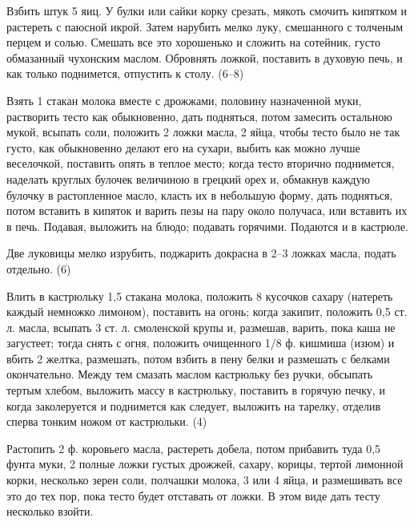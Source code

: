 
Взбить штук 5 яиц. У булки или сайки корку срезать, мякоть смочить кипятком и растереть с паюсной икрой. Затем нарубить мелко луку, смешанного с толченым перцем и солью. Смешать все это хорошенько и сложить на сотейник, густо обмазанный чухонским маслом. Обровнять ложкой, поставить в духовую печь, и как только поднимется, отпустить к столу. (6--8) 


Взять 1 стакан молока вместе с дрожжами, половину назначенной муки, растворить тесто как обыкновенно, дать подняться, потом замесить остальною мукой, всыпать соли, положить 2 ложки масла, 2 яйца, чтобы тесто было не так густо, как обыкновенно делают его на сухари, выбить как можно лучше веселочкой, поставить опять в теплое место; когда тесто вторично поднимется, наделать круглых булочек величиною в грецкий орех и, обмакнув каждую булочку в растопленное масло, класть их в небольшую форму, дать подняться, потом вставить в кипяток и варить пезы на пару около получаса, или вставить их в печь. Подавая, выложить на блюдо; подавать горячими. Подаются и в кастрюле.

Две луковицы мелко изрубить, поджарить докрасна в 2--3 ложках масла, подать отдельно. (6) 


Влить в кастрюльку 1,5 стакана молока, положить 8 кусочков сахару (натереть каждый немножко лимоном), поставить на огонь; когда закипит, положить 0,5 ст. л. масла, всыпать 3 ст. л. смоленской крупы и, размешав, варить, пока каша не загустеет; тогда снять с огня, положить очищенного 1/8 ф. кишмиша (изюм) и вбить 2 желтка, размешать, потом взбить в пену белки и размешать с белками окончательно. Между тем смазать маслом кастрюльку без ручки, обсыпать тертым хлебом, выложить массу в кастрюльку, поставить в горячую печку, и когда заколеруется и поднимется как следует, выложить на тарелку, отделив сперва тонким ножом от кастрюльки. (4)


Растопить 2 ф. коровьего масла, растереть добела, потом прибавить туда 0,5 фунта муки, 2 полные ложки густых дрожжей, сахару, корицы, тертой лимонной корки, несколько зерен соли, полчашки молока, 3 или 4 яйца, и размешивать все это до тех пор, пока тесто будет отставать от ложки. В этом виде дать тесту несколько взойти.

